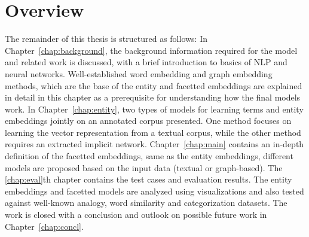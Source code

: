 
\section{Overview}
The remainder of this thesis is structured as follows: In Chapter~\ref{chap:background}, the background information required for the model and related work is discussed, with a brief introduction to  basics of NLP and neural networks. Well-established word embedding and graph embedding methods, which are the base of the entity and facetted embeddings\added{,} are explained in detail in this chapter as a pre\deleted{-}requisite for understanding how the final models work. In Chapter~\ref{chap:entity}, two types of models for learning terms and entity embeddings jointly on an annotated corpus  presented. One method focuses on learning the vector representation from a textual corpus, while the other method requires an extracted implicit network.
Chapter~\ref{chap:main} contains an in-depth definition of the facetted embeddings, same as the entity embeddings, different models are proposed based on the input data (textual or graph-based). The \ref{chap:eval}th chapter contains the test cases and evaluation results. The entity embeddings and facetted models are analyzed using visualizations and also tested against well-known analogy, word similarity and categorization datasets. The work is closed with a conclusion and outlook on possible future work in Chapter~\ref{chap:concl}. 

